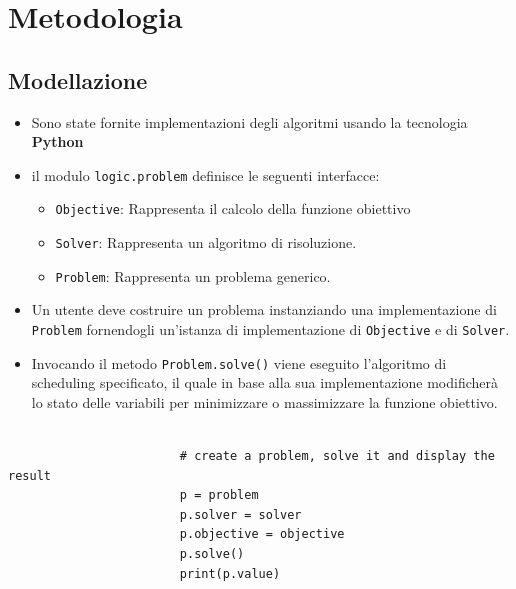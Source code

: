 \documentclass[compress]{beamer}
\begin{document}
\section{Metodologia}
    \subsection{Modellazione}
    
    \begin{frame}{\subsecname}

            \begin{itemize}
                \item Sono state fornite implementazioni degli algoritmi usando
                la tecnologia \textbf{Python}
                \item il modulo \texttt{logic.problem} definisce le seguenti interfacce:
                \begin{itemize}
                    \item \texttt{Objective}: Rappresenta il calcolo della funzione obiettivo
                    \item \texttt{Solver}: Rappresenta un algoritmo di risoluzione.
                    \item \texttt{Problem}: Rappresenta un problema generico.
                \end{itemize}
            \end{itemize}

    \end{frame}

    \begin{frame}[fragile]{\subsecname}
        \begin{itemize}
        \item Un utente deve costruire un problema instanziando una implementazione
        di \texttt{Problem} fornendogli un'istanza di implementazione di \texttt{Objective}
        e di \texttt{Solver}.
        \item Invocando il metodo \texttt{Problem.solve()} viene eseguito 
            l'algoritmo di scheduling specificato, il quale in base alla sua implementazione
            modificherà lo stato delle variabili per minimizzare o massimizzare la funzione obiettivo.    
        \end{itemize}    
            \scriptsize
                \begin{center}
                    \begin{verbatim}
                        
                        # create a problem, solve it and display the result
                        p = problem
                        p.solver = solver
                        p.objective = objective
                        p.solve()
                        print(p.value)
                    \end{verbatim}
                \end{center}        
    \end{frame}
\end{document}
